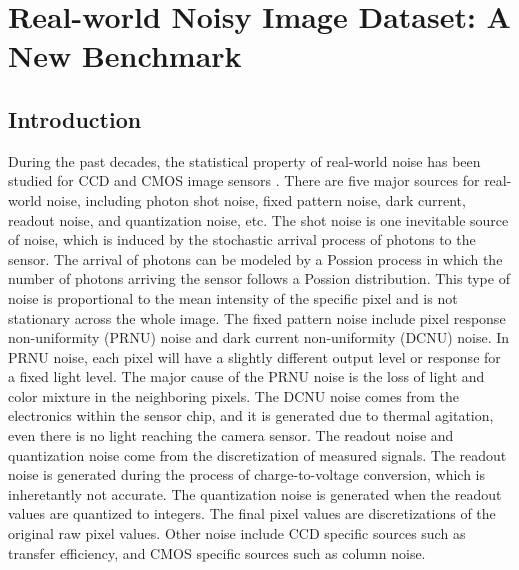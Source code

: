 %
\chapter{Real-world Noisy Image Dataset: A New Benchmark}
\label{sec:dataset}

\section{Introduction}

During the past decades, the statistical property of real-world noise has been studied for CCD and CMOS image sensors \cite{healey1994radiometric,tsin2001statistical,RENOIR2014,crosschannel2016,dnd2017}. There are five major sources for real-world noise, including photon shot noise, fixed pattern noise, dark current, readout noise, and quantization noise, etc. The shot noise is one inevitable source of noise, which is induced by the stochastic arrival process of photons to the sensor. The arrival of photons can be modeled by a Possion process in which the number of photons arriving the sensor follows a Possion distribution. This type of noise is proportional to the mean intensity of the specific pixel and is not stationary across the whole image. The fixed pattern noise include pixel response non-uniformity (PRNU) noise and dark current non-uniformity (DCNU) noise. In PRNU noise, each pixel will have a slightly different output level or response for a fixed light level. The major cause of the PRNU noise is the loss of light and color mixture in the neighboring pixels. The DCNU noise comes from the electronics within the sensor chip, and it is generated due to thermal agitation, even there is no light reaching the camera sensor. The readout noise and quantization noise come from the discretization of measured signals. The readout noise is generated during the process of charge-to-voltage conversion, which is inheretantly not accurate. The quantization noise is generated when the readout values are quantized to integers. The final pixel values are discretizations of the original raw pixel values. Other noise include CCD specific sources such as transfer efficiency, and CMOS specific sources such as column noise.

